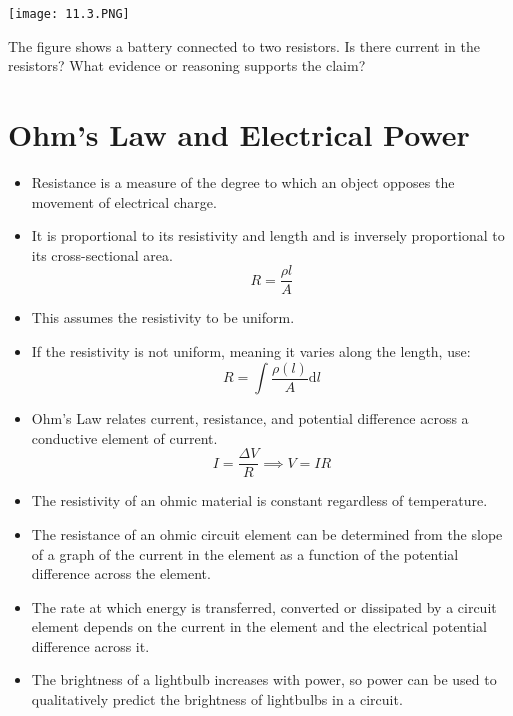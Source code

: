 \documentclass[../em.tex]{subfiles}
\begin{document}
\ex 
\begin{center}
    \texttt{[image: 11.3.PNG]}
\end{center}
The figure shows a battery connected to two resistors. Is there current in the resistors? What evidence or reasoning supports the claim?



\section{Ohm's Law and Electrical Power}
\begin{itemize}
    \item Resistance is a measure of the degree to which an object opposes the movement of electrical charge.
    \item It is proportional to its resistivity and length and is inversely proportional to its cross-sectional area.
    \[R=\frac{\rho l}{A}\]
    \item This assumes the resistivity to be uniform.
    
    \item If the resistivity is not uniform, meaning it varies along the length, use:
    \[R=\int{\frac{\rho(l)}{A}}\mathrm{d}l\]

    \item Ohm's Law relates current, resistance, and potential difference across a conductive element of current.
    \[I=\frac{\Delta V}{R}\implies V = IR\]

    \item The resistivity of an ohmic material is constant regardless of temperature.
    
    \item The resistance of an ohmic circuit element can be determined from the slope of a graph of the current in the element as a function of the potential difference across the element.
    \item The rate at which energy is transferred, converted or dissipated by a circuit element depends on the current in the element and the electrical potential difference across it.
    \item The brightness of a lightbulb increases with power, so power can be used to qualitatively predict the brightness of lightbulbs in a circuit.
\end{itemize}
\end{document}
